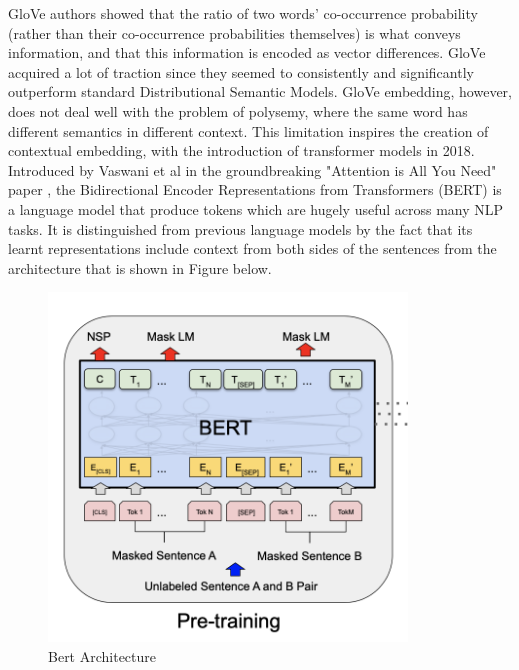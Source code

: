 GloVe authors showed that the ratio of two words' co-occurrence probability (rather than their co-occurrence probabilities themselves) is what conveys information, and that this information is encoded as vector differences. GloVe acquired a lot of traction since they seemed to consistently and significantly outperform standard Distributional Semantic Models. GloVe embedding, however, does not deal well with the problem of polysemy, where the same word has different semantics in different context. This limitation inspires the creation of contextual embedding, with the introduction of transformer models in 2018. Introduced by Vaswani et al in the groundbreaking "Attention is All You Need" paper \cite{DBLP:journals/corr/VaswaniSPUJGKP17}, the Bidirectional Encoder Representations from Transformers (BERT) is a language model that produce tokens which are hugely useful across many NLP tasks. It is distinguished from previous language models by the fact that its learnt representations include context from both sides of the sentences from the architecture that is shown in Figure  below. 

\begin{figure}[htbp]
  \centering
    \includegraphics[width=0.85\textwidth]{Figures/Chapter1/bert.png}
  \caption{Bert Architecture}
  \label{fig:bert}
\end{figure}


